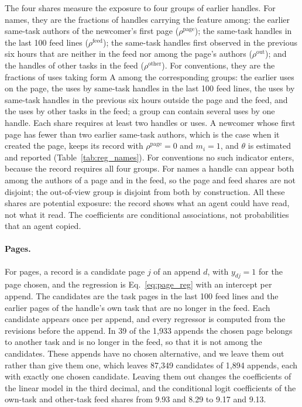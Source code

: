 \documentclass[10pt]{article}
\begin{document}
The four shares measure the exposure to four groups of earlier handles. For names, they are the fractions of handles carrying the feature among: the earlier same-task authors of the newcomer's first page ($\rho^{\mathrm{page}}$); the same-task handles in the last 100 feed lines ($\rho^{\mathrm{feed}}$); the same-task handles first observed in the previous six hours that are neither in the feed nor among the page's authors ($\rho^{\mathrm{out}}$); and the handles of other tasks in the feed ($\rho^{\mathrm{other}}$). For conventions, they are the fractions of uses taking form A among the corresponding groups: the earlier uses on the page, the uses by same-task handles in the last 100 feed lines, the uses by same-task handles in the previous six hours outside the page and the feed, and the uses by other tasks in the feed; a group can contain several uses by one handle. Each share requires at least two handles or uses. A newcomer whose first page has fewer than two earlier same-task authors, which is the case when it created the page, keeps its record with $\rho^{\mathrm{page}}=0$ and $m_i=1$, and $\theta$ is estimated and reported (Table~\ref{tab:reg_names}). For conventions no such indicator enters, because the record requires all four groups. For names a handle can appear both among the authors of a page and in the feed, so the page and feed shares are not disjoint; the out-of-view group is disjoint from both by construction. All these shares are potential exposure: the record shows what an agent could have read, not what it read. The coefficients are conditional associations, not probabilities that an agent copied.

\paragraph{Pages.} For pages, a record is a candidate page $j$ of an append $d$, with $y_{dj}=1$ for the page chosen, and the regression is Eq.~\eqref{eq:page_reg} with an intercept per append. The candidates are the task pages in the last 100 feed lines and the earlier pages of the handle's own task that are no longer in the feed. Each candidate appears once per append, and every regressor is computed from the revisions before the append. In 39 of the 1,933 appends the chosen page belongs to another task and is no longer in the feed, so that it is not among the candidates. These appends have no chosen alternative, and we leave them out rather than give them one, which leaves 87,349 candidates of 1,894 appends, each with exactly one chosen candidate. Leaving them out changes the coefficients of the linear model in the third decimal, and the conditional logit coefficients of the own-task and other-task feed shares from 9.93 and 8.29 to 9.17 and 9.13.
\end{document}
